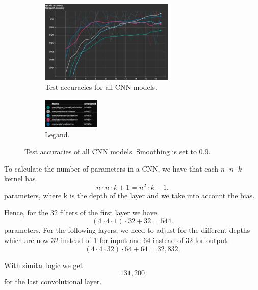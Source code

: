 \documentclass{article}
\begin{document}
\begin{figure}[h!]
    \centering
    \begin{subfigure}[t]{\textwidth}
        \centering
        \includegraphics[width=0.7\textwidth]{./plots/screenshot10.png} %
        \caption{Test accuracies for all CNN models.}
        \label{fig:subfig17a}
    \end{subfigure}
    \vspace{0.2cm}
    \begin{subfigure}[t]{\textwidth}
        \centering
        \includegraphics[width=0.3\textwidth]{./plots/screenshot11.png} %
        \caption{Legand.}
        \label{fig:subfig17b}
    \end{subfigure}
    \caption{Test accuracies of all CNN models. Smoothing is set to 0.9.}
    \label{fig:plot17}
\end{figure}

To calculate the number of parameters in a CNN, we have that each \(n \cdot n \cdot k\) kernel has
\[
n \cdot n \cdot k + 1 = n^2 \cdot k + 1.
\]
parameters, where k is the depth of the layer and we take into account the bias. 

Hence, for the 32 filters of the first layer we have
\[
(4 \cdot 4 \cdot 1) \cdot 32 + 32 = 544.
\]
parameters. For the following layers, we need to adjust for the different depths which are now 32 instead of 1 for input and 64 instead of 32 for output:
\[
(4 \cdot 4 \cdot 32) \cdot 64 + 64 = 32,832.
\]

With similar logic we get
\[
131,200
\]
for the last convolutional layer.
\end{document}
